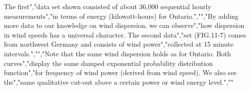 {{{{{{{The first","data set shown consisted of about 36,000 sequential hourly measurements","in terms of energy (kilowatt-hours) for Ontario.","","By adding more data to our knowledge on wind dispersion, we can observe","how dispersion in wind speeds has a universal character. The second data","set (FIG.11-7) comes from northwest Germany and consists of wind power","collected at 15 minute intervals.","","Note that the same wind dispersion holds as for Ontario. Both curves","display the same damped exponential probability distribution function","for frequency of wind power (derived from wind speed). We also see the","same qualitative cut-out above a certain power or wind energy level.",""}}}}}}}
